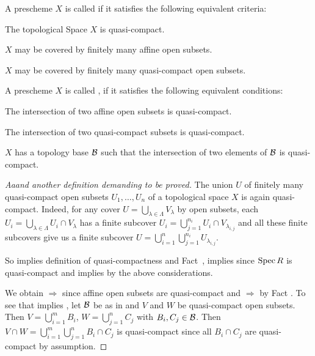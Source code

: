 \documentclass[a4paper,parskip=half,numbers=enddot, DIV=12]{scrreprt}
\begin{document}
\begin{defi}
    A prescheme $X$ is called  if it satisfies the following equivalent criteria:
    \begin{alphanumerate}
        \item 
            The topological Space $X$ is quasi-compact.
        \item 
            $X$ may be covered by finitely many affine open subsets. 
        \item 
            $X$ may be covered by finitely many quasi-compact open subsets.
    \end{alphanumerate}
    A prescheme $X$ is called , if it satisfies the following equivalent conditions:
    \begin{alphanumerate}\setcounter{enumi}{3}
        \item 
            The intersection of two affine open subsets is quasi-compact.
        \item 
            The intersection of two quasi-compact subsets is quasi-compact. 
        \item 
            $X$ has a topology base $\mathcal{B}$ such that the intersection of two elements of $\mathcal{B}$ is quasi-compact.
    \end{alphanumerate}
\end{defi}
\begin{proof}[Aaand another definition demanding to be proved]
    The union $U$ of finitely many quasi-compact open subsets $U_1,\ldots,U_n$ of a topological space $X$ is again quasi-compact. Indeed, for any cover $U= \bigcup_{\lambda\in\Lambda} V_{\lambda}$ by open subsets, each $U_i = \bigcup_{\lambda\in \Lambda} U_i\cap V_\lambda$ has a finite subcover $U_i=\bigcup_{j=1}^{n_i}U_i\cap V_{\lambda_{i,j}}$ and all these finite subcovers give us a finite subcover $U = \bigcup_{i=1}^n \bigcup_{j=1}^{n_i} U_{\lambda_{i,j}}$. 
    
    So  implies  definition of quasi-compactness and Fact~,  implies  since $\operatorname{Spec} R$ is quasi-compact and  implies  by the above considerations. 
    
    We obtain  $\Rightarrow$  since affine open subsets are quasi-compact and  $\Rightarrow$  by Fact . To see that  implies , let $\mathcal{B}$ be as in  and $V$ and $W$ be quasi-compact open subsets. Then $V= \bigcup_{i=1}^m B_i$, $W=\bigcup_{j=1}^n C_j$ with $B_i,C_j\in \mathcal{B}$. Then $V\cap W = \bigcup_{i=1}^m \bigcup_{j=1}^n B_i\cap C_j$ is quasi-compact since all $B_i\cap C_j$ are quasi-compact by assumption.
\end{proof}
\end{document}
